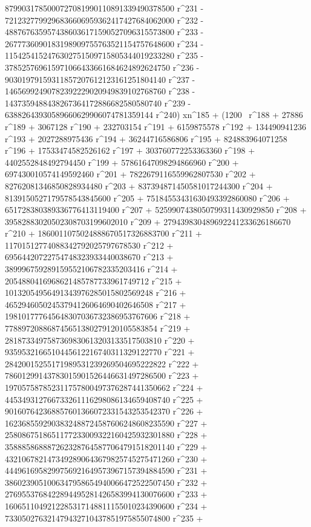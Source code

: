        8799031785000727081990110891339490378500 r^231 - 
       7212327799296836606959362417427684062000 r^232 - 
       4887676359574386036171590527096315573800 r^233 - 
       2677736090183198909755763521154757648600 r^234 - 
       1154254152476302751509715805344019233280 r^235 - 
       378525769615971066433661684624892624750 r^236 - 
       90301979159311857207612123161251804140 r^237 - 
       14656992490782392229020949839102768760 r^238 - 
       1437359488438267364172886682580580740 r^239 - 
       63882643930589660629906074781359144 r^240) xn^185 + (1200 \
r^188 + 27886 r^189 + 3067128 r^190 + 232703154 r^191 + 
       6159875578 r^192 + 134490941236 r^193 + 2027288975436 r^194 + 
       36244716586806 r^195 + 824883964071258 r^196 + 
       17533474582526162 r^197 + 303760772253363360 r^198 + 
       4402552848492794450 r^199 + 57861647098294866960 r^200 + 
       697430010574149592460 r^201 + 7822679116559962807530 r^202 + 
       82762081346850828934480 r^203 + 
       837394871450581017244300 r^204 + 
       8139150527179578543845600 r^205 + 
       75184553431630493392860080 r^206 + 
       651728380389336776413119400 r^207 + 
       5259907438050799311430929850 r^208 + 
       39582883020502308703199602010 r^209 + 
       279439830489692241233626186670 r^210 + 
       1860011075024888670517326883700 r^211 + 
       11701512774088342792025797678530 r^212 + 
       69564420722754748323933440038670 r^213 + 
       389996759289159552106782335203416 r^214 + 
       2054880416968621485787733961749712 r^215 + 
       10132054956491343976285015802569248 r^216 + 
       46529460502453794126064690402646508 r^217 + 
       198101777645648307036732386953767606 r^218 + 
       778897208868745651380279120105583854 r^219 + 
       2818733497587369830613203133517503810 r^220 + 
       9359532166510445612216740311329122770 r^221 + 
       28420015255171989531239269504695222822 r^222 + 
       78601299143783015901526446631497286500 r^223 + 
       197057587852311757800497376287441350662 r^224 + 
       445349312766733261116298086134659408740 r^225 + 
       901607642368857601366072331543253542370 r^226 + 
       1623685592903832488724587606248608235590 r^227 + 
       2580867518651177233009322160425932301880 r^228 + 
       3588858688872623287645877064791518201140 r^229 + 
       4321067821473492890643679825745275471260 r^230 + 
       4449616958299756921649573967157394884590 r^231 + 
       3860239051006347958654940066472522507450 r^232 + 
       2769553768422894495281426583994130076600 r^233 + 
       1606511049212285317148811155010234390600 r^234 + 
       733050276321479432710437851975855074800 r^235 + 
